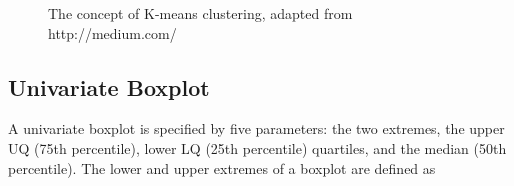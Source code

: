 \begin{figure}[h]
	\centering
	\quad
	\quad
	\quad
	\caption{The concept of K-means clustering, adapted from http://medium.com/}
	\label{clusteringtheory}
\end{figure}
\subsection{Univariate Boxplot}
A univariate boxplot \cite{frigge1989some} is specified by five parameters: the two extremes, the upper UQ (75th percentile), lower LQ (25th percentile) quartiles, and the median (50th percentile). The lower and upper extremes of a boxplot are defined as

